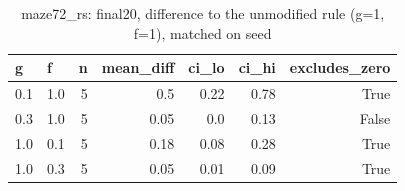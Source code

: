 \begin{table}[t]
\centering
\small
\begin{tabular}{llrrrrr}
\toprule
g & f & n & mean\_diff & ci\_lo & ci\_hi & excludes\_zero \\
\midrule
0.1 & 1.0 & 5 & 0.5 & 0.22 & 0.78 & True \\
0.3 & 1.0 & 5 & 0.05 & 0.0 & 0.13 & False \\
1.0 & 0.1 & 5 & 0.18 & 0.08 & 0.28 & True \\
1.0 & 0.3 & 5 & 0.05 & 0.01 & 0.09 & True \\
\bottomrule
\end{tabular}
\caption{maze72\_rs: final20, difference to the unmodified rule (g=1, f=1), matched on seed}
\label{tab:plasticity_maze72_rs_final20_paired}
\end{table}